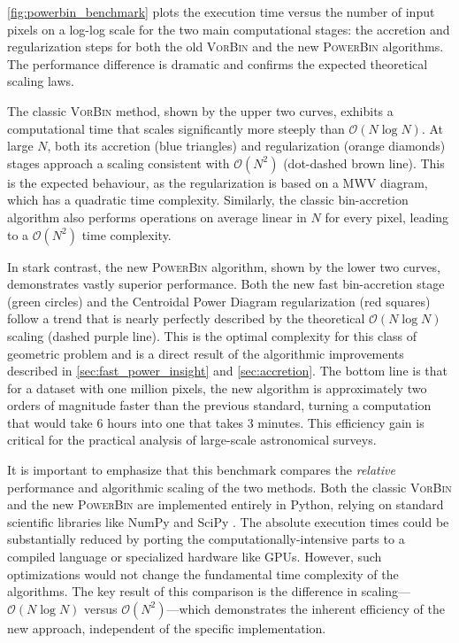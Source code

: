 \documentclass[fleqn,usenatbib]{mnras}
\begin{document}
\autoref{fig:powerbin_benchmark} plots the execution time versus the number of input pixels on a log-log scale for the two main computational stages: the accretion and regularization steps for both the old \textsc{VorBin} and the new \textsc{PowerBin} algorithms. The performance difference is dramatic and confirms the expected theoretical scaling laws.

The classic \textsc{VorBin} method, shown by the upper two curves, exhibits a computational time that scales significantly more steeply than $\mathcal{O}(N\log N)$. At large $N$, both its accretion (blue triangles) and regularization (orange diamonds) stages approach a scaling consistent with $\mathcal{O}(N^2)$ (dot-dashed brown line). This is the expected behaviour, as the regularization is based on a MWV diagram, which has a quadratic time complexity. Similarly, the classic bin-accretion algorithm also performs operations on average linear in $N$ for every pixel, leading to a $\mathcal{O}(N^2)$ time complexity.

In stark contrast, the new \textsc{PowerBin} algorithm, shown by the lower two curves, demonstrates vastly superior performance. Both the new fast bin-accretion stage (green circles) and the Centroidal Power Diagram regularization (red squares) follow a trend that is nearly perfectly described by the theoretical $\mathcal{O}(N\log N)$ scaling (dashed purple line). This is the optimal complexity for this class of geometric problem and is a direct result of the algorithmic improvements described in \autoref{sec:fast_power_insight} and \autoref{sec:accretion}. The bottom line is that for a dataset with one million pixels, the new algorithm is approximately two orders of magnitude faster than the previous standard, turning a computation that would take 6 hours into one that takes 3 minutes. This efficiency gain is critical for the practical analysis of large-scale astronomical surveys.

It is important to emphasize that this benchmark compares the \textit{relative} performance and algorithmic scaling of the two methods. Both the classic \textsc{VorBin} and the new \textsc{PowerBin} are implemented entirely in Python, relying on standard scientific libraries like NumPy \citep{Numpy2020} and SciPy \citep{Scipy2020}. The absolute execution times could be substantially reduced by porting the computationally-intensive parts to a compiled language or specialized hardware like GPUs. However, such optimizations would not change the fundamental time complexity of the algorithms. The key result of this comparison is the difference in scaling---$\mathcal{O}(N\log N)$ versus $\mathcal{O}(N^2)$---which demonstrates the inherent efficiency of the new approach, independent of the specific implementation.
\end{document}
